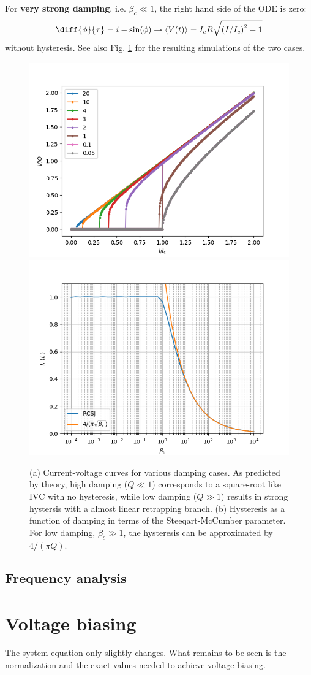 \documentclass[reprint,onecolumn,%
amsmath,amssymb,aip,apl]{revtex4-1}
\begin{document}
	For \textbf{very strong damping}, i.e. $\beta_c\ll1$, the right hand side of the ODE is zero:
	\begin{eqnarray}
	\diff{\phi}{\tau}=i-\sin(\phi) \rightarrow \langle V(t) \rangle=I_c R\sqrt{\left(I/I_c\right)^2-1}
	\end{eqnarray}
	without hysteresis.
	See also Fig. \ref{fig:hysteresis} for the resulting simulations of the two cases.
	
	
	\begin{figure}
		\centering
		\includegraphics[width=0.49\linewidth]{figs/ivcs_updown}\hfill
		\includegraphics[width=0.49\linewidth]{figs/hysteresis_loglin}
		\caption{(a) Current-voltage curves for various damping cases.
			As predicted by theory, high damping ($Q\ll1$) corresponds to a square-root like IVC with no hysteresis, while low damping ($Q\gg1$) results in strong hystersis with a almost linear retrapping branch. (b) Hysteresis as a function of damping in terms of the Steeqart-McCumber parameter. For low damping, $\beta_c\gg1$, the hysteresis can be approximated by $4/(\pi Q)$.}
		\label{fig:hysteresis}
	\end{figure}
	
	\subsection{Frequency analysis}
	
	\section{Voltage biasing}
	The system equation only slightly changes.
	What remains to be seen is the normalization and the exact values needed to achieve voltage biasing.
	
	
	
\end{document}
